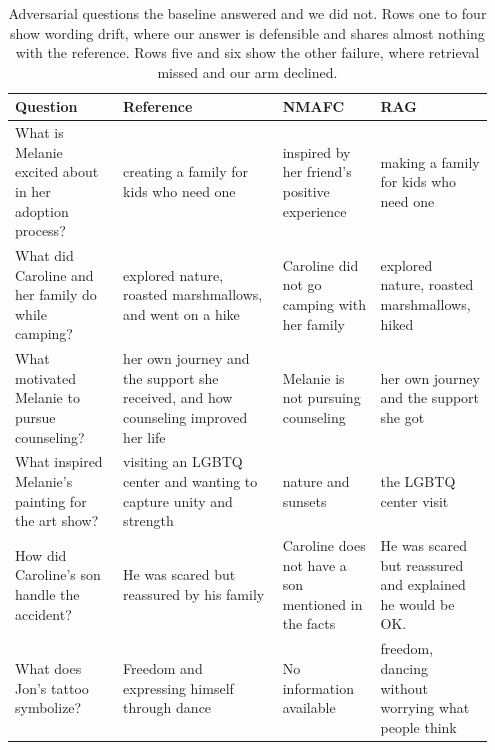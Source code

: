 \documentclass[10pt,a4paper,twocolumn]{article}
\begin{document}
\begin{table}[tb]
\centering
\caption{Adversarial questions the baseline answered and we did not. Rows one to four show wording drift, where our answer is defensible and shares almost nothing with the reference. Rows five and six show the other failure, where retrieval missed and our arm declined.}\label{table:advloss}
\small
\begin{tabular}{p{0.210\linewidth}p{0.319\linewidth}p{0.199\linewidth}p{0.222\linewidth}}
\toprule
Question & Reference & NMAFC & RAG \\
\midrule
What is Melanie excited about in her adoption process? & creating a family for kids who need one & inspired by her friend's positive experience & making a family for kids who need one \\
What did Caroline and her family do while camping? & explored nature, roasted marshmallows, and went on a hike & Caroline did not go camping with her family & explored nature, roasted marshmallows, hiked \\
What motivated Melanie to pursue counseling? & her own journey and the support she received, and how counseling improved her life & Melanie is not pursuing counseling & her own journey and the support she got \\
What inspired Melanie's painting for the art show? & visiting an LGBTQ center and wanting to capture unity and strength & nature and sunsets & the LGBTQ center visit \\
How did Caroline's son handle the accident? & He was scared but reassured by his family & Caroline does not have a son mentioned in the facts & He was scared but reassured and explained he would be OK. \\
What does Jon's tattoo symbolize? & Freedom and expressing himself through dance & No information available & freedom, dancing without worrying what people think \\
\bottomrule
\end{tabular}
\end{table}
\end{document}
